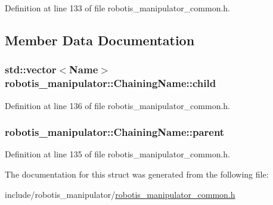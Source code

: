 Definition at line 133 of file robotis\+\_\+manipulator\+\_\+common.\+h.



\subsection{Member Data Documentation}
\subsubsection[{\texorpdfstring{child}{child}}]{\setlength{\rightskip}{0pt plus 5cm}std\+::vector$<${\bf Name}$>$ robotis\+\_\+manipulator\+::\+Chaining\+Name\+::child}\hypertarget{structrobotis__manipulator_1_1_chaining_name_a600be40420b93d2d8596d07d7e36fbf2}{}\label{structrobotis__manipulator_1_1_chaining_name_a600be40420b93d2d8596d07d7e36fbf2}


Definition at line 136 of file robotis\+\_\+manipulator\+\_\+common.\+h.

\subsubsection[{\texorpdfstring{parent}{parent}}]{ robotis\+\_\+manipulator\+::\+Chaining\+Name\+::parent}\hypertarget{structrobotis__manipulator_1_1_chaining_name_aa5e92a4939b2884e63bee3690f387627}{}\label{structrobotis__manipulator_1_1_chaining_name_aa5e92a4939b2884e63bee3690f387627}


Definition at line 135 of file robotis\+\_\+manipulator\+\_\+common.\+h.



The documentation for this struct was generated from the following file\+:\begin{DoxyCompactItemize}
\item 
include/robotis\+\_\+manipulator/\hyperlink{robotis__manipulator__common_8h}{robotis\+\_\+manipulator\+\_\+common.\+h}\end{DoxyCompactItemize}
